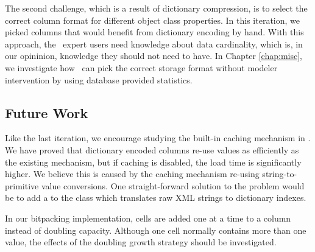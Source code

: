 The second challenge, which is a result of dictionary compression, is to select the correct column format for different object class properties. In this iteration, we picked columns that would benefit from dictionary encoding by hand. With this approach, the \gap~expert users need knowledge about data cardinality, which is, in our opininion, knowledge they should not need to have. In Chapter \ref{chap:misc}, we investigate how \gap~can pick the correct storage format without modeler intervention by using database provided statistics.

\subsection{Future Work}
\label{compression:future-work}
Like the last iteration, we encourage studying the built-in caching mechanism in \gap. We have proved that dictionary encoded columns re-use values as efficiently as the existing mechanism, but if caching is disabled, the load time is significantly higher. We believe this is caused by the caching mechanism re-using string-to-primitive value conversions. One straight-forward solution to the problem would be to add a  to the  class which translates raw XML strings to dictionary indexes.

In our bitpacking implementation, cells are added one at a time to a column instead of doubling capacity. Although one cell normally contains more than one value, the effects of the doubling growth strategy should be investigated.
